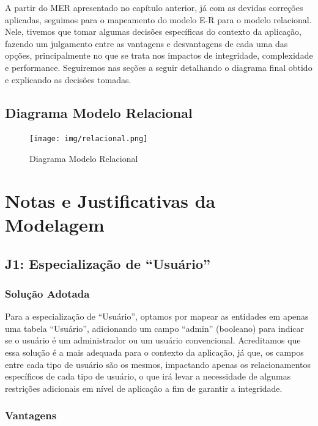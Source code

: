 A partir do MER apresentado no capítulo anterior, já com as devidas correções
aplicadas, seguimos para o mapeamento do modelo E-R para o modelo relacional.
Nele, tivemos que tomar algumas decisões específicas do contexto da aplicação,
fazendo um julgamento entre as vantagens e desvantagens de cada uma das opções,
principalmente no que se trata nos impactos de integridade, complexidade e
performance. Seguiremos nas seções a seguir detalhando o diagrama final obtido
e explicando as decisões tomadas.

\begin{landscape}
  \section{Diagrama Modelo Relacional}

  \begin{figure}[h]
    \texttt{[image: img/relacional.png]}
    \caption{Diagrama Modelo Relacional}
    \label{fig:relacional}
  \end{figure}
\end{landscape}

\section{Notas e Justificativas da Modelagem}

\subsection{\textbf{J1:} Especialização de ``Usuário''}

\subsubsection{Solução Adotada}

Para a especialização de ``Usuário'', optamos por mapear as entidades em apenas
uma tabela ``Usuário'', adicionando um campo ``admin'' (booleano) para indicar
se o usuário é um administrador ou um usuário convencional. Acreditamos que
essa solução é a mais adequada para o contexto da aplicação, já que, os campos
entre cada tipo de usuário são os mesmos, impactando apenas os relacionamentos
específicos de cada tipo de usuário, o que irá levar a necessidade de algumas
restrições adicionais em nível de aplicação a fim de garantir a integridade.

\subsubsection{Vantagens}

